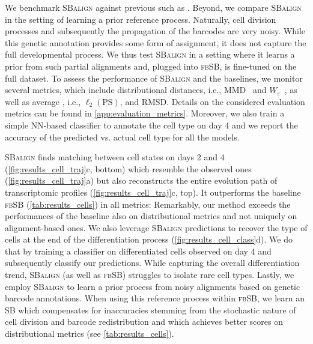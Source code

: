 We benchmark \textsc{SBalign} against previous  such as \citep[\textsc{fbSB}]{chen2021likelihood}. Beyond, we compare \textsc{SBalign} in the setting of learning a prior reference process. Naturally, cell division processes and subsequently the propagation of the barcodes are very noisy. While this genetic annotation provides some form of assignment, it does not capture the full developmental process. We thus test \textsc{SBalign} in a setting where it learns a prior from such partial alignments and, plugged into \textsc{fbSB}, is fine-tuned on the full dataset.
To assess the performance of \textsc{SBalign} and the baselines, we monitor several metrics, which include distributional distances, i.e., \acrshort{MMD}~\citep{gretton2012kernel} and $W_\varepsilon$~\citep{cuturi2013sinkhorn}, as well as average , i.e., $\ell_2(\text{PS})$, and \acrfull{RMSD}. Details on the considered evaluation metrics can be found in \cref{app:evaluation_metrics}.
Moreover, we also train a simple \acrlong{NN}-based classifier to annotate the cell type on day 4 and we report the accuracy of the predicted vs. actual cell type for all the models.


\textsc{SBalign} finds matching between cell states on days 2 and 4 (\cref{fig:results_cell_traj}c, bottom) which resemble the observed ones (\cref{fig:results_cell_traj}a) but also reconstructs the entire evolution path of transcriptomic profiles (\cref{fig:results_cell_traj}c, top).
It outperforms the baseline \textsc{fbSB} (\cref{tab:results_cells}) in all metrics: Remarkably, our method exceeds the performances of the baseline also on distributional metrics and not uniquely on alignment-based ones.
We also leverage \textsc{SBalign} predictions to recover the type of cells at the end of the differentiation process (\cref{fig:results_cell_class}d). We do that by training a classifier on differentiated cells observed on day 4 and subsequently classify our predictions. %
While capturing the overall differentiation trend, \textsc{SBalign} (as well as \textsc{fbSB}) struggles to isolate rare cell types.
Lastly, we employ \textsc{SBalign} to learn a prior process from noisy alignments based on genetic barcode annotations. When using this reference process within \textsc{fbSB}, we learn an \acrshort{SB} which compensates for inaccuracies stemming from the stochastic nature of cell division and barcode redistribution and which achieves better scores on distributional metrics (see \cref{tab:results_cells}).


